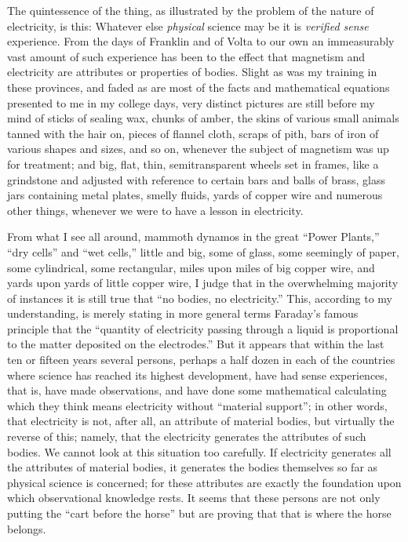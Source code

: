 \documentclass[a4paper, 11pt, oneside, polutonikogreek, english, landscape]{article}
\begin{document}
The quintessence of the thing, as illustrated by the problem of the nature of electricity, is this: Whatever else \emph{physical} science may be it is \emph{verified sense} experience. From the days of Franklin and of Volta to our own an immeasurably vast amount of such experience has been to the effect that magnetism and electricity are attributes or properties of bodies. Slight as was my training in these provinces, and faded as are most of the facts and mathematical equations presented to me in my college days, very distinct pictures are still before my mind of sticks of sealing wax, chunks of amber, the skins of various small animals tanned with the hair on, pieces of flannel cloth, scraps of pith, bars of iron of various shapes and sizes, and so on, whenever the subject of magnetism was up for treatment; and big, flat, thin, semitransparent wheels set in frames, like a grindstone and adjusted with reference to certain bars and balls of brass, glass jars containing metal plates, smelly fluids, yards of copper wire and numerous other things, whenever we were to have a lesson in electricity.

From what I see all around, mammoth dynamos in the great ``Power Plants,'' ``dry cells'' and ``wet cells,'' little and big, some of glass, some seemingly of paper, some cylindrical, some rectangular, miles upon miles of big copper wire, and yards upon yards of little copper wire, I judge that in the overwhelming majority of instances it is still true that ``no bodies, no electricity.'' This, according to my understanding, is merely stating in more general terms Faraday's famous principle that the ``quantity of electricity passing through a liquid is proportional to the matter deposited on the electrodes.'' But it appears that within the last ten or fifteen years several persons, perhaps a half dozen in each of the countries where science has reached its highest development, have had sense experiences, that is, have made observations, and have done some mathematical calculating which they think means electricity without ``material support''; in other words, that electricity is not, after all, an attribute of material bodies, but virtually the reverse of this; namely, that the electricity generates the attributes of such bodies. We cannot look at this situation too carefully. If electricity generates all the attributes of material bodies, it generates the bodies themselves so far as physical science is concerned; for these attributes are exactly the foundation upon which observational knowledge rests. It seems that these persons are not only putting the ``cart before the horse'' but are proving that that is where the horse belongs.
\end{document}
